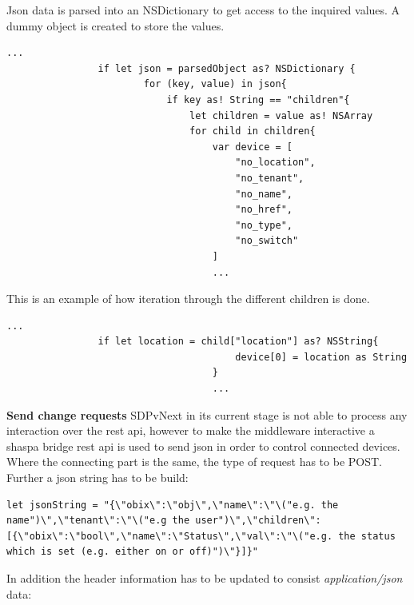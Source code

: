 	        	Json data is parsed into an NSDictionary to get access to the inquired values. A dummy object is created to store the values.

	        	\begin{lstlisting}[caption=Json parsing]
	        	...
	        	if let json = parsedObject as? NSDictionary {
	                    for (key, value) in json{
	                        if key as! String == "children"{
	                            let children = value as! NSArray
	                            for child in children{
	                                var device = [
	                                    "no_location",
	                                    "no_tenant",
	                                    "no_name",
	                                    "no_href",
	                                    "no_type",
	                                    "no_switch"
	                                ]
	                             	...
	        	\end{lstlisting}

	        	This is an example of how iteration through the different children is done.

	        	\begin{lstlisting}[caption=Json iteration]
	        	...
	        	if let location = child["location"] as? NSString{
	                                    device[0] = location as String
	                                }
	                             	...
	        	\end{lstlisting}

	        \pagebreak

	        \textbf{Send change requests}
				SDPvNext in its current stage is not able to process any interaction over the rest api, however to make the middleware interactive a shaspa bridge rest api is used to send json in order to control connected devices.
				Where the connecting part is the same, the type of request has to be POST. Further a json string has to be build:

				\begin{lstlisting}[caption=Json build]
	        	let jsonString = "{\"obix\":\"obj\",\"name\":\"\("e.g. the name")\",\"tenant\":\"\("e.g the user")\",\"children\":[{\"obix\":\"bool\",\"name\":\"Status\",\"val\":\"\("e.g. the status which is set (e.g. either on or off)")\"}]}"
	        	\end{lstlisting}

	        	In addition the header information has to be updated to consist \textit{application/json} data:

